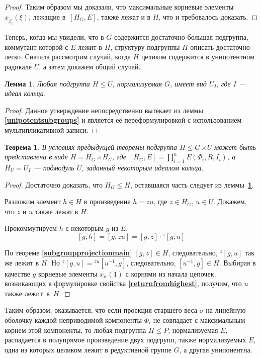 \documentclass[12pt]{matmex-diploma}
\theoremstyle{mystyleni}
\theoremstyle{mystyle}
\newtheorem{thm}{Теорема}
\newtheorem{lm}{Лемма}
\newcommand\refb[1]{\textbf{\ref{#1}}}
\renewcommand{\le}{\leqslant}
\begin{document}
\begin{proof}
Таким образом мы доказали, что максимальные корневые элементы $x_{\widetilde\beta_i}(\xi)$, лежащие в~$[H_G,E]$, также лежат и в $H$, что и требовалось доказать.

\end{proof}

Теперь, когда мы увидели, что в $G$ содержится достаточно большая подгруппа, коммутант которой с $E$ лежит в $H$, структуру подгруппы $H$ описать достаточно легко. Сначала рассмотрим случай, когда $H$ целиком содержится в унипотентном радикале $U$, а затем докажем общий случай.

\newpage
\begin{lm}\label{unipotenttransitivity}
  Любая подгруппа $H \le U$, нормализуемая $G$, имеет вид $U_I$, где $I$ --- идеал кольца.
\end{lm}
\begin{proof}
Данное утверждение непосредственно вытекает из леммы \refb{unipotentsubgroups} и является её переформулировкой с использованием мультипликативной записи.
\end{proof}
\begin{thm}
В условиях предыдущей теоремы подгруппа $H\le G \rightthreetimes U$ может быть представлена в виде $H = H_G \rightthreetimes H_U$, где $[H_G,E] = \prod_{i=1}^n E(\Phi_i, R, I_i)$, а $H_U=U_I$ --- подмодуль $U$, заданный некоторым идеалом кольца.
\end{thm}
\begin{proof}
Достаточно доказать, что $H_G \le H$, оставшаяся часть следует из леммы~\refb{unipotenttransitivity}.

Разложим элемент $h \in H$ в произведение $h = z u$, где $z \in H_G$, $u \in U$. Докажем, что $z$ и $u$ также лежат в $H$.

Прокоммутируем $h$ с некоторым $g$ из $E$:
$$ [g, h] = [g,zu] = [g,z] \cdot {}^z[g,u] $$

По теореме \refb{subgroupprojectionmain} $[g,z]\in H$, следовательно, ${}^z[g,u]$ так же лежит в $H$. Но
$ {}^z[g,u] = {}^{zu}[u^{-1},g] $, следовательно, $[u^{-1},g] \in H$. Выбирая в качестве $g$ корневые элементы $x_\alpha(1)$ с корнями из начала цепочек, возникающих в формулировке свойства \refb{returnfromhighest}, получим, что $u$ также лежит~в~$H$.
\end{proof}

Таким образом, оказывается, что если проекция старшего веса $\sigma$ на линейную оболочку каждой неприводимой компоненты $\Phi_i$ не совпадает с максимальным корнем этой компоненты, то любая подгруппа $H \le P$, нормализуемая $E$, распадается в полупрямое произведение двух подгрупп, также нормализуемых $E$, одна из которых целиком лежит в редуктивной группе $G$, а другая унипонентна.
\end{document}
